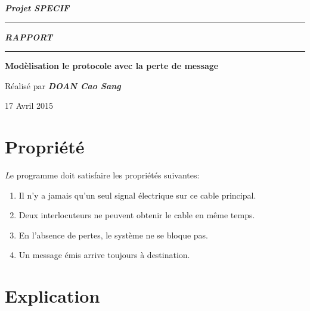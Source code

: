 \documentclass[a4paper,11pt]{report}
\begin{document}
	\begin{titlepage}
		\begin{center}
			\large\bfseries\itshape Projet SPECIF\\
		\end{center}
		\noindent\rule{\linewidth}{3pt}

		\begin{center}
			\Huge\bfseries\itshape RAPPORT\\
		\end{center}
		
		\noindent\rule{\linewidth}{3pt}
		\begin{center}
			\bfseries
			\large Modèlisation le protocole avec la perte de message
			
		\end{center}
		\begin{center}
			Réalisé par \bfseries \itshape DOAN Cao Sang
		\end{center}
		\begin{center}
			17 Avril 2015
		\end{center}
	\end{titlepage}

\chapter{Propriété}
	{\huge \itshape L}e programme doit satisfaire les propriétés suivantes:
		\begin{enumerate}
			\item Il n'y a jamais qu'un seul signal électrique sur ce cable principal.
			\item Deux interlocuteurs ne peuvent obtenir le cable en même temps.
			\item En l'absence de pertes, le système ne se bloque pas.
			\item Un message émis arrive toujours à destination.
		\end{enumerate}
	
\chapter{Explication}
%
	
\end{document}

